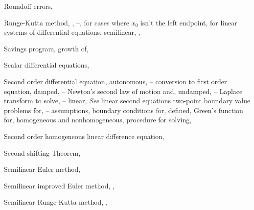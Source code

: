 \begin{theindex}
  \item Roundoff errors, \pageref{eq:3.1.2}

  \item Runge-Kutta method, \pageref{eq:3.1.7}, \pageref{eq:3.3.1}--\pageref{exer:3.3.28}, \pageref{exer:10.1.1}
    \subitem for cases where $x_{0}$ isn't the left endpoint, \pageref{eq:3.3.3}
    \subitem for linear systems of differential equations, \pageref{exer:10.1.1}
    \subitem semilinear, \pageref{exer:3.1.1}, \pageref{example:3.3.4} 

  \item Savings program, growth of, \pageref{example:4.1.6}

  \item Scalar differential equations, \pageref{example:10.1.6}

  \item Second order differential equation, \pageref{eq:1.1.10}
    \subitem autonomous, \pageref{eq:4.4.1}--\pageref{exer:4.4.24}
      \subsubitem conversion to first order equation, \pageref{eq:4.4.1}
      \subsubitem damped, \pageref{eq:4.4.27}--\pageref{exer:4.4.24}
      \subsubitem Newton's second law of motion and, \pageref{eq:4.4.6}
      \subsubitem undamped, \pageref{eq:4.4.7}--\pageref{eq:4.4.17}
    \subitem Laplace transform to solve, \pageref{example:8.3.2}--\pageref{exer:8.3.1}
    \subitem linear, \emph{See} linear second equations
    \subitem two-point boundary value problems for, \pageref{eq:13.1.1}--\pageref{exer:13.1.32}
      \subsubitem assumptions, \pageref{eq:13.1.5}
      \subsubitem boundary conditions for, \pageref{eq:13.1.5}
      \subsubitem defined, \pageref{eq:13.1.5}
      \subsubitem Green's function for, \pageref{eq:13.1.21}
      \subsubitem homogeneous and nonhomogeneous, \pageref{eq:13.1.6}
      \subsubitem procedure for solving, \pageref{eq:13.1.7}

  \item Second order homogeneous linear difference equation, \pageref{exer:7.3.30}

  \item Second shifting Theorem, \pageref{thmtype:8.4.2}--\pageref{exer:8.4.1}

  \item Semilinear Euler method, \pageref{eq:3.1.21}

  \item Semilinear improved Euler method, \pageref{exer:3.1.1}, \pageref{example:3.2.4}

  \item Semilinear Runge-Kutta method, \pageref{exer:3.1.21}, \pageref{exer:3.3.4}


\end{theindex}
